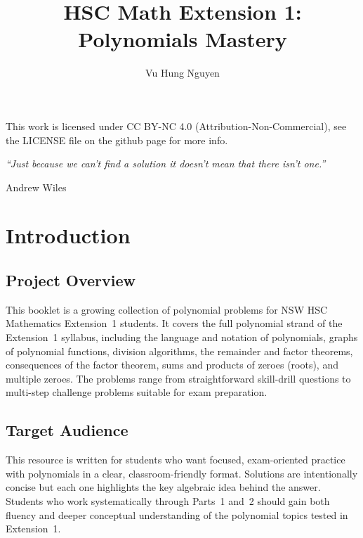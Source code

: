 \documentclass[12pt]{article}
\author{Vu Hung Nguyen}
\title{HSC Math Extension 1: Polynomials Mastery}
\date{}
\begin{document}


\newpage



\begingroup\small\noindent This work is licensed under CC BY-NC 4.0 (Attribution-Non-Commercial), see the LICENSE file on the github page for more info.\par\endgroup

\newpage

\thispagestyle{empty}
\vspace*{\fill}
\begin{center}
\itshape
``Just because we can't find a solution it doesn't mean that there isn't one.''

\vspace{1em}
\normalfont Andrew Wiles
\end{center}
\vspace*{\fill}

\newpage

\tableofcontents
\newpage

\section{Introduction}

\subsection{Project Overview}
This booklet is a growing collection of polynomial problems for NSW HSC Mathematics Extension~1 students. It covers the full polynomial strand of the Extension~1 syllabus, including the language and notation of polynomials, graphs of polynomial functions, division algorithms, the remainder and factor theorems, consequences of the factor theorem, sums and products of zeroes (roots), and multiple zeroes. The problems range from straightforward skill-drill questions to multi-step challenge problems suitable for exam preparation.

\subsection{Target Audience}
This resource is written for students who want focused, exam-oriented practice with polynomials in a clear, classroom-friendly format. Solutions are intentionally concise but each one highlights the key algebraic idea behind the answer. Students who work systematically through Parts~1 and~2 should gain both fluency and deeper conceptual understanding of the polynomial topics tested in Extension~1.
\end{document}
